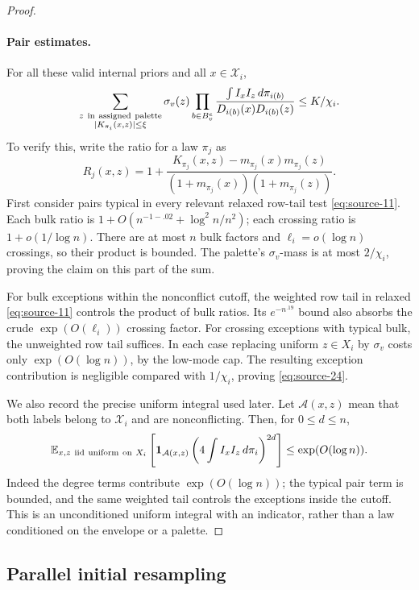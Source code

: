 \begin{proof}
\paragraph{Pair estimates.}
For all these valid internal priors and all \(x\in\mathcal X_i\),
\begin{equation}
 \sum_{\substack{z\ {\rm in\ assigned\ palette}\\
                  |K_{\pi_i}(x,z)|\le\xi}}
  \sigma_v(z)\prod_{b\in B_v^e}
    \frac{\int I_xI_z\,d\pi_{i(b)}}{D_{i(b)}(x)D_{i(b)}(z)}
       \le K/\chi_i .                                          \label{eq:source-24}
\end{equation}
To verify this, write the ratio for a law \(\pi_j\) as
\[
 R_j(x,z)=1+
 \frac{K_{\pi_j}(x,z)-m_{\pi_j}(x)m_{\pi_j}(z)}
      {(1+m_{\pi_j}(x))(1+m_{\pi_j}(z))}.
\]
First consider pairs typical in every relevant relaxed row-tail test
\eqref{eq:source-11}. Each bulk ratio is
\(1+O(n^{-1-.02}+\log^2n/n^2)\); each crossing ratio is
\(1+o(1/\log n)\). There are at most \(n\) bulk factors and
\(\ell_i=o(\log n)\) crossings, so their product is bounded. The
palette's \(\sigma_v\)-mass is at most \(2/\chi_i\), proving the
claim on this part of the sum.

For bulk exceptions within the nonconflict cutoff, the weighted row tail
in relaxed \eqref{eq:source-11} controls the product of bulk ratios.
Its \(e^{-n^{.19}}\) bound also absorbs the crude
\(\exp(O(\ell_i))\) crossing factor. For crossing exceptions with
typical bulk, the unweighted row tail suffices. In each case replacing
uniform \(z\in X_i\) by \(\sigma_v\) costs only
\(\exp(O(\log n))\), by the low-mode cap. The resulting exception
contribution is negligible compared with \(1/\chi_i\), proving
\eqref{eq:source-24}.

We also record the precise uniform integral used later. Let
\(\mathcal A(x,z)\) mean that both labels belong to \(\mathcal X_i\)
and are nonconflicting. Then, for \(0\le d\le n\),
\[
 \mathbb E_{x,z\ {\rm iid\ uniform\ on}\ X_i}
 \left[\mathbf1_{\mathcal A(x,z)}
       \left(4\int I_xI_z\,d\pi_i\right)^{2d}\right]
       \le\exp(O(\log n)).
\]
Indeed the degree terms contribute \(\exp(O(\log n))\); the typical
pair term is bounded, and the same weighted tail controls the exceptions
inside the cutoff. This is an unconditioned uniform integral with an
indicator, rather than a law conditioned on the envelope or a palette.
\end{proof}

\subsection{Parallel initial resampling}
\label{sec:parallel-initial-resampling}

